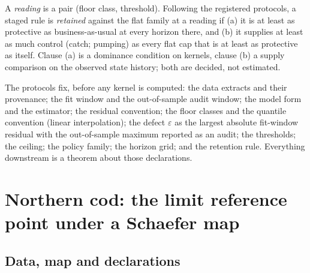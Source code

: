 \documentclass[11pt,a4paper]{article}
\theoremstyle{plain}
\theoremstyle{definition}
\theoremstyle{remark}
\begin{document}
A \emph{reading} is a pair (floor class, threshold). Following the registered protocols, a staged rule is \emph{retained} against the flat family at a reading if (a) it is at least as protective as business-as-usual at every horizon there, and (b) it supplies at least as much control (catch; pumping) as every flat cap that is at least as protective as itself. Clause (a) is a dominance condition on kernels, clause (b) a supply comparison on the observed state history; both are decided, not estimated.

The protocols fix, before any kernel is computed: the data extracts and their provenance; the fit window and the out-of-sample audit window; the model form and the estimator; the residual convention; the floor classes and the quantile convention (linear interpolation); the defect $\varepsilon$ as the largest absolute fit-window residual with the out-of-sample maximum reported as an audit; the thresholds; the ceiling; the policy family; the horizon grid; and the retention rule. Everything downstream is a theorem about those declarations.

\section{Northern cod: the limit reference point under a Schaefer map}\label{sec:cod}

\subsection{Data, map and declarations}\label{sec:cod-data}
\end{document}
